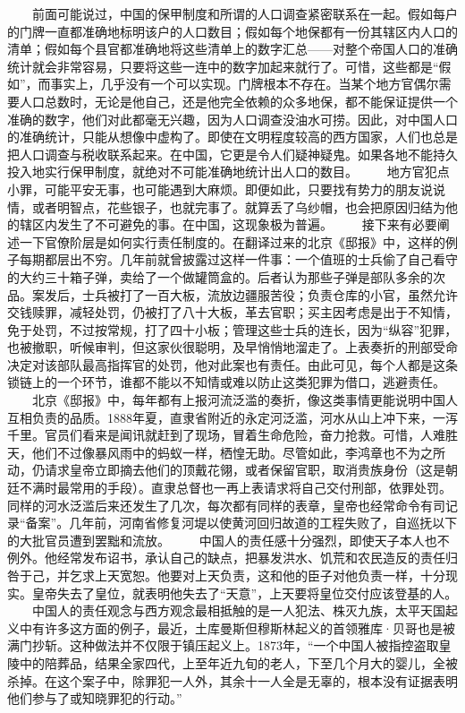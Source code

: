 \documentclass[12pt,oneside]{book}
\begin{document}
\begin{common-format}
　　前面可能说过，中国的保甲制度和所谓的人口调查紧密联系在一起。假如每户的门牌一直都准确地标明该户的人口数目；假如每个地保都有一份其辖区内人口的清单；假如每个县官都准确地将这些清单上的数字汇总——对整个帝国人口的准确统计就会非常容易，只要将这些一连中的数字加起来就行了。可惜，这些都是“假如”，而事实上，几乎没有一个可以实现。门牌根本不存在。当某个地方官偶尔需要人口总数时，无论是他自己，还是他完全依赖的众多地保，都不能保证提供一个准确的数字，他们对此都毫无兴趣，因为人口调查没油水可捞。因此，对中国人口的准确统计，只能从想像中虚构了。即使在文明程度较高的西方国家，人们也总是把人口调查与税收联系起来。在中国，它更是令人们疑神疑鬼。如果各地不能持久投入地实行保甲制度，就绝对不可能准确地统计出人口的数目。 
　　地方官犯点小罪，可能平安无事，也可能遇到大麻烦。即便如此，只要找有势力的朋友说说情，或者明智点，花些银子，也就完事了。就算丢了乌纱帽，也会把原因归结为他的辖区内发生了不可避免的事。在中国，这现象极为普遍。 
　　接下来有必要阐述一下官僚阶层是如何实行责任制度的。在翻译过来的北京《邸报》中，这样的例子每期都层出不穷。几年前就曾披露过这样一件事：一个值班的士兵偷了自己看守的大约三十箱子弹，卖给了一个做罐筒盒的。后者认为那些子弹是部队多余的次品。案发后，士兵被打了一百大板，流放边疆服苦役；负责仓库的小官，虽然允许交钱赎罪，减轻处罚，仍被打了八十大板，革去官职；买主因考虑是出于不知情，免于处罚，不过按常规，打了四十小板；管理这些士兵的连长，因为“纵容”犯罪，也被撤职，听候审判，但这家伙很聪明，及早悄悄地溜走了。上表奏折的刑部受命决定对该部队最高指挥官的处罚，他对此案也有责任。由此可见，每个人都是这条锁链上的一个环节，谁都不能以不知情或难以防止这类犯罪为借口，逃避责任。 
　　北京《邸报》中，每年都有上报河流泛滥的奏折，像这类事情更能说明中国人互相负责的品质。1888年夏，直隶省附近的永定河泛滥，河水从山上冲下来，一泻千里。官员们看来是闻讯就赶到了现场，冒着生命危险，奋力抢救。可惜，人难胜天，他们不过像暴风雨中的蚂蚁一样，栖惶无助。尽管如此，李鸿章也不为之所动，仍请求皇帝立即摘去他们的顶戴花翎，或者保留官职，取消贵族身份（这是朝廷不满时最常用的手段）。直隶总督也一再上表请求将自己交付刑部，依罪处罚。同样的河水泛滥后来还发生了几次，每次都有同样的表章，皇帝也经常命令有司记录“备案”。几年前，河南省修复河堤以使黄河回归故道的工程失败了，自巡抚以下的大批官员遭到罢黜和流放。 
　　中国人的责任感十分强烈，即使天子本人也不例外。他经常发布诏书，承认自己的缺点，把暴发洪水、饥荒和农民造反的责任归咎于己，并乞求上天宽恕。他要对上天负责，这和他的臣子对他负责一样，十分现实。皇帝失去了皇位，就表明他失去了“天意”，上天要将皇位交付应该登基的人。 
　　中国人的责任观念与西方观念最相抵触的是一人犯法、株灭九族，太平天国起义中有许多这方面的例子，最近，土库曼斯但穆斯林起义的首领雅库·贝哥也是被满门抄斩。这种做法并不仅限于镇压起义上。1873年，“一个中国人被指控盗取皇陵中的陪葬品，结果全家四代，上至年近九旬的老人，下至几个月大的婴儿，全被杀掉。在这个案子中，除罪犯一人外，其余十一人全是无辜的，根本没有证据表明他们参与了或知晓罪犯的行动。” 

\end{common-format}
\end{document}
